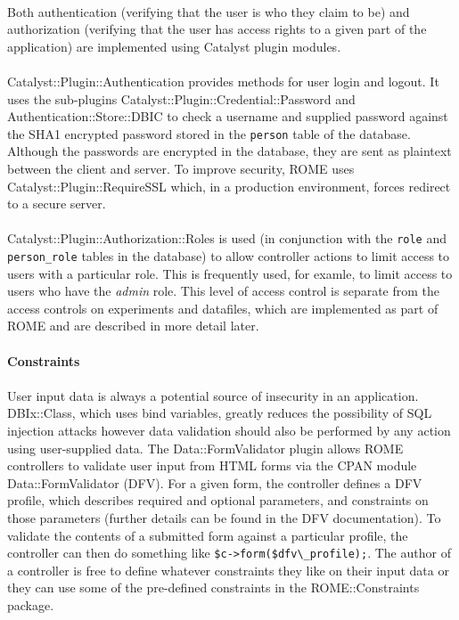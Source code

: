 \paragraph{}
Both authentication (verifying that the user is who they claim to be) and authorization (verifying that the user has access rights to a given part of the application) are implemented using Catalyst plugin modules. 

\paragraph{}
Catalyst::Plugin::Authentication provides methods for user login and logout. It uses the sub-plugins Catalyst::Plugin::Credential::Password and Authentication::Store::DBIC to check a username and supplied password against the SHA1 encrypted password stored in the \texttt{person} table of the database. Although the passwords are encrypted in the database, they are sent as plaintext between the client and server. To improve security, ROME uses Catalyst::Plugin::RequireSSL which, in a production environment, forces redirect to a secure server.

\paragraph{}
Catalyst::Plugin::Authorization::Roles is used (in conjunction with the \texttt{role} and \texttt{person\_role} tables in the database) to allow controller actions to limit access to users with a particular role. This is frequently used, for examle, to limit access to users who have the \textit{admin} role. This level of access control is separate from the access controls on experiments and datafiles, which are implemented as part of ROME and are described in more detail later.


\paragraph{Constraints}

\paragraph{}
User input data is always a potential source of insecurity in an application. DBIx::Class, which uses bind variables, greatly reduces the possibility of SQL injection attacks however data validation should also be performed by any action using user-supplied data. The Data::FormValidator plugin allows ROME controllers to validate user input from HTML forms via the CPAN module Data::FormValidator (DFV). For a given form, the controller defines a DFV profile, which describes required and optional parameters, and constraints on those parameters (further details can be found in the DFV documentation). To validate the contents of a submitted form against a particular profile, the controller can then do something like \verb|$c->form($dfv\_profile);|. The author of a controller is free to define whatever constraints they like on their input data or they can use some of the pre-defined constraints in the ROME::Constraints package.

